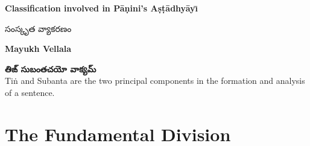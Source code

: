 \documentclass[12pt,a4paper]{article}
\newcommand{\te}[1]{{\telugufont #1}}
\begin{document}

\begin{titlepage}
\centering
\vspace*{20mm}

{\Huge\bfseries Classification involved in P\={a}\d{n}ini's A\d{s}\d{t}\={a}dhy\={a}y\={\i}\par}
\vspace{5mm}
{\Large\te{సంస్కృత వ్యాకరణం}\par}

\vspace{8mm}

{\large\bfseries
Mayukh Vellala
\par}

\vspace{15mm}

\begin{mainbox}
\centering
{\LARGE\bfseries\te{తిఙ్ సుబంతచయో వాక్యమ్}}
\vspace{4mm}
\\
\large
Tiṅ and Subanta are the two principal components
in the formation and analysis of a sentence.
\end{mainbox}

\vfill
\end{titlepage}


\tableofcontents
\clearpage
{}

\section{The Fundamental Division}
\end{document}
